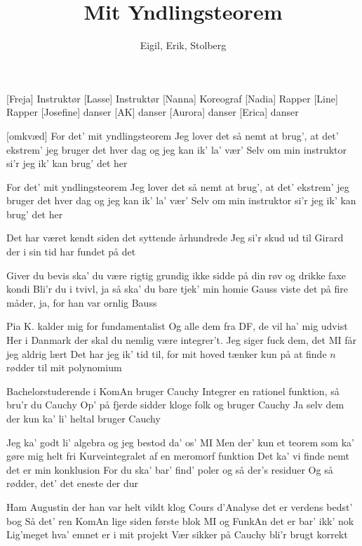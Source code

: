 \documentclass[a4paper,11pt]{article}
\title{Mit Yndlingsteorem}
\author{Eigil, Erik, Stolberg}
\begin{document}
\maketitle

\begin{roles}
[Freja] Instruktør
[Lasse] Instruktør
[Nanna] Koreograf
[Nadia] Rapper
[Line] Rapper
[Josefine] danser
[AK] danser
[Aurora] danser
[Erica] danser
\end{roles}

\begin{song}
[omkvæd] For det' mit yndlingsteorem
Jeg lover det så nemt at brug', at det' ekstrem'
jeg bruger det hver dag
og jeg kan ik' la' vær'
Selv om min instruktor si'r jeg ik' kan brug' det her

For det' mit yndlingsteorem
Jeg lover det så nemt at brug', at det' ekstrem'
jeg bruger det hver dag
og jeg kan ik' la' vær'
Selv om min instruktor si'r jeg ik' kan brug' det her

 Det har været kendt siden det syttende århundrede
Jeg si'r skud ud til Girard der i sin tid har fundet på det

Giver du bevis ska' du være rigtig grundig
ikke sidde på din røv og drikke faxe kondi
Bli'r du i tvivl, ja så ska' du bare tjek' min homie Gauss
viste det på fire måder, ja,  for han var ornlig Bauss

Pia K. kalder mig for fundamentalist
Og alle dem fra DF, de vil ha' mig udvist
Her i Danmark der skal du nemlig være integrer't.
Jeg siger fuck dem, det MI får jeg aldrig lært
Det har jeg ik' tid til, for mit hoved tænker kun
på at finde $n$ rødder til mit polynomium

 Bachelorstuderende i KomAn bruger Cauchy
Integrer en rationel funktion, så bru'r du Cauchy
Op' på fjerde sidder kloge folk og bruger Cauchy
Ja selv dem der kun ka' li' heltal bruger Cauchy

Jeg ka' godt li' algebra og jeg bestod da' os' MI
Men der' kun et teorem som ka' gøre mig helt fri
Kurveintegralet af en meromorf funktion
Det ka' vi finde nemt det er min konklusion
For du ska' bar' find' poler og så der's residuer
Og så rødder, det' det eneste der dur

Ham Augustin der han var helt vildt klog
Cours d'Analyse det er verdens bedst' bog
Så det' ren KomAn lige siden første blok
MI og FunkAn det er bar' ikk' nok
Lig'meget hva' emnet er i mit projekt
Vær sikker på Cauchy bli'r brugt korrekt


\end{song}
\end{document}
